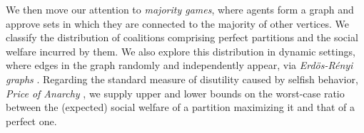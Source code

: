 \documentclass[letterpaper]{article} %
\begin{document}
We then move our attention to \textit{majority games}, where agents form a graph and approve sets in which they are connected to the majority of other vertices. We classify the distribution of coalitions comprising perfect partitions and the social welfare incurred by them. We also explore this distribution in dynamic settings, where edges in the graph randomly and independently appear, via \textit{Erd\"{o}s-R\'{e}nyi graphs} \cite{erdos59random}. Regarding the standard measure of disutility caused by selfish behavior, \textit{Price of Anarchy} \cite{koutsoupias1999worst,elkind2016price}, we supply upper and lower bounds on the worst-case ratio between the (expected) social welfare of a partition maximizing it and that of a perfect one. %



\end{document}
